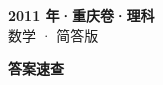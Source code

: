 \documentclass[zihao=-4, a4paper]{ctexart}
\begin{document}
\begin{center}
  {\Large\bfseries 2011 年·重庆卷·理科}\\[4pt]
  {\large 数学 · 简答版}
\end{center}
\medskip
{}

\clearpage
{}
\begin{center}{\Large\bfseries 答案速查}\end{center}
\medskip

\end{document}
